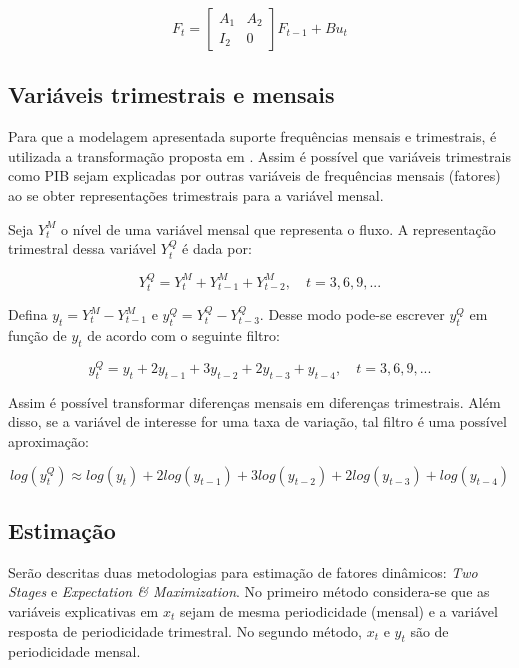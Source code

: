 \documentclass{article}
\begin{document}
\begin{equation}
F_t
=
\begin{bmatrix}
A_1 & A_2 \\
I_2 & 0
\end{bmatrix}
F_{t-1}
+
B
u_t
\end{equation}


\subsection{Variáveis trimestrais e mensais}\label{variaveisQM}

Para que a modelagem apresentada suporte frequências mensais e trimestrais, é utilizada a transformação proposta em \cite{marianomurasawa2003}. Assim é possível que variáveis trimestrais como PIB sejam explicadas por outras variáveis de frequências mensais (fatores) ao se obter representações trimestrais para a variável mensal.

Seja $Y_t^M$ o nível de uma variável mensal que representa o fluxo. A representação trimestral dessa variável $Y_t^Q$ é dada por:

\begin{equation}
Y_t^Q = Y_t^M + Y_{t-1}^M + Y_{t-2}^M, \quad  t = 3,6,9,...
\end{equation}

Defina $y_t = Y_t^M - Y_{t-1}^M$ e $y_t^Q = Y_t^Q - Y_{t-3}^Q$. Desse modo pode-se escrever $y_t^Q$ em função de $y_t$ de acordo com o seguinte filtro:

\begin{equation}
y_t^Q = y_t + 2y_{t-1} + 3y_{t-2} + 2y_{t-3} + y_{t-4}, \quad  t = 3,6,9,...
\end{equation}

Assim é possível transformar diferenças mensais em diferenças trimestrais. Além disso, se a variável de interesse for uma taxa de variação, tal filtro é uma possível aproximação:

\begin{equation}
log(y_t^Q) \approx log(y_t) + 2log(y_{t-1}) + 3log(y_{t-2}) + 2log(y_{t-3}) + log(y_{t-4})
\end{equation}

\subsection{Estimação}\label{estima}

Serão descritas duas metodologias para estimação de fatores dinâmicos: \textit{Two Stages} e \textit{Expectation \& Maximization}. No primeiro método considera-se que as variáveis explicativas em $x_t$ sejam de mesma periodicidade (mensal) e a variável resposta de periodicidade trimestral. No segundo método, $x_t$ e $y_t$ são de periodicidade mensal.
\end{document}
